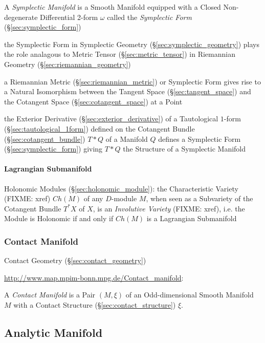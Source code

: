 A \emph{Symplectic Manifold} is a Smooth Manifold equipped with a Closed
Non-degenerate Differential 2-form $\omega$ called the \emph{Symplectic Form}
(\S\ref{sec:symplectic_form})

the Symplectic Form in Symplectic Geometry (\S\ref{sec:symplectic_geometry})
plays the role analagous to Metric Tensor (\S\ref{sec:metric_tensor}) in
Riemannian Geometry (\S\ref{sec:riemannian_geometry})

a Riemannian Metric (\S\ref{sec:riemannian_metric}) or Symplectic Form gives
rise to a Natural Isomorphism between the Tangent Space
(\S\ref{sec:tangent_space}) and the Cotangent Space
(\S\ref{sec:cotangent_space}) at a Point

the Exterior Derivative (\S\ref{sec:exterior_derivative}) of a Tautological
$1$-form (\S\ref{sec:tautological_1form}) defined on the Cotangent Bundle
(\S\ref{sec:cotangent_bundle}) $T *
Q$ of a Manifold $Q$ defines a Symplectic Form (\S\ref{sec:symplectic_form})
giving $T * Q$ the Structure of a Symplectic Manifold



\paragraph{Lagrangian Submanifold}\label{sec:lagrangian_submanifold}\hfill

\fist Holonomic Modules (\S\ref{sec:holonomic_module}): the Characteristic
Variety (FIXME: xref) $Ch(M)$ of any $D$-module $M$, when seen as a Subvariety
of the Cotangent Bundle $T^*X$ of $X$, is an \emph{Involutive Variety} (FIXME:
xref), i.e. the Module is Holonomic if and only if $Ch(M)$ is a Lagrangian
Submanifold



\subsubsection{Contact Manifold}\label{sec:contact_manifold}

\fist Contact Geometry (\S\ref{sec:contact_geometry})

\url{http://www.map.mpim-bonn.mpg.de/Contact_manifold}:

A \emph{Contact Manifold} is a Pair $(M,\xi)$ of an Odd-dimensional Smooth
Manifold $M$ with a Contact Structure (\S\ref{sec:contact_structure}) $\xi$.



\subsection{Analytic Manifold}\label{sec:analytic_manifold}

